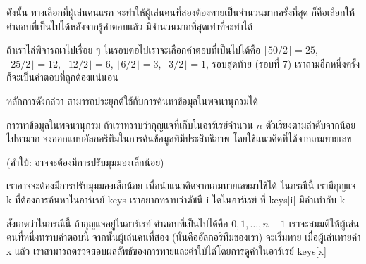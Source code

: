 \begin{quizans}
ดังนั้น ทางเลือก{\wbr}ที่{\wbr}ผู้{\wbr}เล่น{\wbr}คน{\wbr}แรก จะ{\wbr}ทำ{\wbr}ให้{\wbr}ผู้{\wbr}เล่น{\wbr}คน{\wbr}ที่{\wbr}สอง{\wbr}ต้อง{\wbr}ทาย{\wbr}เป็น{\wbr}จำนวน{\wbr}มาก{\wbr}ครั้ง{\wbr}ที่สุด{\wbr}
ก็{\wbr}คือ{\wbr}เลือก{\wbr}ให้{\wbr}คำตอบ{\wbr}ที่{\wbr}เป็น{\wbr}ไป{\wbr}ได้{\wbr}หลังจาก{\wbr}รู้{\wbr}คำตอบ{\wbr}แล้ว มี{\wbr}จำนวน{\wbr}มาก{\wbr}ที่สุด{\wbr}เท่า{\wbr}ที่{\wbr}จะ{\wbr}ทำ{\wbr}ได้{\wbr}

ถ้า{\wbr}เรา{\wbr}ไล่{\wbr}พิจารณา{\wbr}ไป{\wbr}เรื่อย ๆ ใน{\wbr}รอบ{\wbr}ต่อไป{\wbr}เรา{\wbr}จะ{\wbr}เลือก{\wbr}คำตอบ{\wbr}ที่{\wbr}เป็น{\wbr}ไป{\wbr}ได้{\wbr}คือ $\lfloor
50/2\rfloor=25$, $\lfloor 25/2\rfloor=12$, $\lfloor 12/2\rfloor=6$,
$\lfloor 6/2\rfloor=3$, $\lfloor 3/2\rfloor=1$, รอบ{\wbr}สุดท้าย (รอบ{\wbr}ที่ 7)
เรา{\wbr}ถาม{\wbr}อีก{\wbr}หนึ่ง{\wbr}ครั้ง ก็{\wbr}จะ{\wbr}เป็น{\wbr}คำตอบ{\wbr}ที่{\wbr}ถูกต้อง{\wbr}แน่นอน{\wbr}
\end{quizans}

หลักการ{\wbr}ดัง{\wbr}กล่{\wbr}วา สามารถ{\wbr}ประยุกต์{\wbr}ใช้{\wbr}กับ{\wbr}การ{\wbr}ค้นหา{\wbr}ข้อ{\wbr}มุ{\wbr}ล{\wbr}ใน{\wbr}พจนานุกรม{\wbr}ได้{\wbr}

\begin{quiz}{การ{\wbr}หา{\wbr}ข้อมูล{\wbr}ใน{\wbr}พจนานุกรม}
ถ้า{\wbr}เรา{\wbr}ทราบ{\wbr}ว่า{\wbr}กุญแจ{\wbr}ที่{\wbr}เก็บ{\wbr}ใน{\wbr}อาร์เรย์{\wbr}จำนวน $n$ ตัว{\wbr}เรียง{\wbr}ตาม{\wbr}ลำดับ{\wbr}จาก{\wbr}น้อย{\wbr}ไป{\wbr}หา{\wbr}มาก{\wbr}
จง{\wbr}ออกแบบ{\wbr}อัล{\wbr}กอ{\wbr}ริ{\wbr}ทึม{\wbr}ใน{\wbr}การ{\wbr}ค้น{\wbr}ข้อมูล{\wbr}ที่{\wbr}มี{\wbr}ประสิทธิภาพ โดย{\wbr}ใช้{\wbr}แนว{\wbr}คิด{\wbr}ที่{\wbr}ได้{\wbr}จาก{\wbr}เกม{\wbr}ทาย{\wbr}เลข{\wbr}

(คำ{\wbr}ใบ้: อาจ{\wbr}จะ{\wbr}ต้อง{\wbr}มี{\wbr}การ{\wbr}ปรับ{\wbr}มุมมอง{\wbr}เล็กน้อย)
\end{quiz}

เรา{\wbr}อาจ{\wbr}จะ{\wbr}ต้อง{\wbr}มี{\wbr}การ{\wbr}ปรับ{\wbr}มุมมอง{\wbr}เล็กน้อย เพื่อ{\wbr}นำ{\wbr}แนว{\wbr}คิด{\wbr}จาก{\wbr}เกม{\wbr}ทาย{\wbr}เลข{\wbr}มา{\wbr}ใช้ได้ ใน{\wbr}กรณี{\wbr}นี้{\wbr}
เรา{\wbr}มี{\wbr}กุญแจ {\ct k} ที่{\wbr}ต้องการ{\wbr}ค้นหา{\wbr}ใน{\wbr}อาร์เรย์ {\ct keys} เรา{\wbr}อยาก{\wbr}ทราบ{\wbr}ว่า{\wbr}ดัชนี {\ct
i} ใด{\wbr}ใน{\wbr}อาร์เรย์ ที่ {\ct keys[i]} มี{\wbr}ค่า{\wbr}เท่า{\wbr}กับ {\ct k}

สังเกต{\wbr}ว่า{\wbr}ใน{\wbr}กรณี{\wbr}นี้ ถ้า{\wbr}กุญแจ{\wbr}อยู่{\wbr}ใน{\wbr}อาร์เรย์ คำตอบ{\wbr}ที่{\wbr}เป็น{\wbr}ไป{\wbr}ได้{\wbr}คือ $0,1,\ldots,n-1$
เรา{\wbr}จะ{\wbr}สมมติ{\wbr}ให้{\wbr}ผู้{\wbr}เล่น{\wbr}คน{\wbr}ที่{\wbr}หนึ่ง{\wbr}ทราบ{\wbr}คำตอบ{\wbr}นี้ จากนั้น{\wbr}ผู้{\wbr}เล่น{\wbr}คน{\wbr}ที่{\wbr}สอง (นั่น{\wbr}คือ{\wbr}อัล{\wbr}กอ{\wbr}ริ{\wbr}ทึม{\wbr}ของ{\wbr}เรา)
จะ{\wbr}เริ่ม{\wbr}ทาย เมื่อ{\wbr}ผู้{\wbr}เล่น{\wbr}ทาย{\wbr}ค่า {\ct x} แล้ว{\wbr}
เรา{\wbr}สามารถ{\wbr}ตรวจสอบ{\wbr}ผลลัพธ์{\wbr}ของ{\wbr}การ{\wbr}ทาย{\wbr}และ{\wbr}คำ{\wbr}ใบ้{\wbr}ได้{\wbr}โดย{\wbr}การ{\wbr}ดู{\wbr}ค่า{\wbr}ใน{\wbr}อาร์เรย์ {\ct keys[x]}

